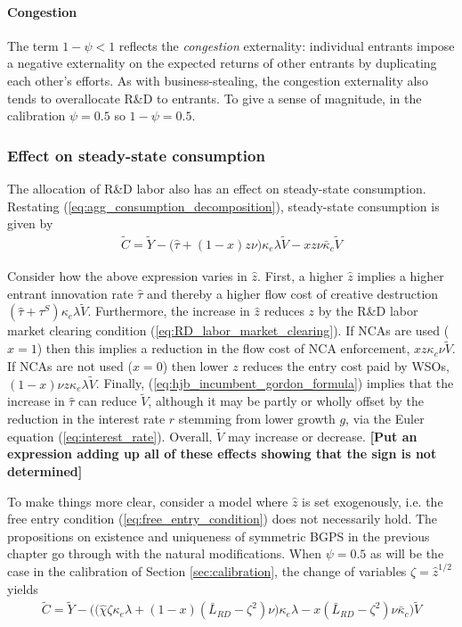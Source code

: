 \documentclass[11pt,english]{article}
\begin{document}
\paragraph{Congestion}

The term $1-\psi < 1$ reflects the \textit{congestion} externality: individual entrants impose a negative externality on the expected returns of other entrants by duplicating each other's efforts. As with business-stealing, the congestion externality also tends to overallocate R\&D to entrants. To give a sense of magnitude, in the calibration $\psi = 0.5$ so $1-\psi = 0.5$.

\subsubsection{Effect on steady-state consumption}

The allocation of R\&D labor also has an effect on steady-state consumption. Restating (\ref{eq:agg_consumption_decomposition}), steady-state consumption is given by
\begin{align} 
\tilde{C} = \tilde{Y} - \big(\hat{\tau} + (1-x) z \nu\big) \kappa_e \lambda \tilde{V}  - x z \nu \bar{\kappa}_c \tilde{V}    
\end{align} 

Consider how the above expression varies in $\hat{z}$. First, a higher $\hat{z}$ implies a higher entrant innovation rate $\hat{\tau}$ and thereby a higher flow cost of creative destruction $(\hat{\tau} + \tau^S)\kappa_e \lambda \tilde{V}$. Furthermore, the increase in $\hat{z}$ reduces $z$ by the R\&D labor market clearing condition (\ref{eq:RD_labor_market_clearing}). If NCAs are used ($x = 1$) then this implies a reduction in the flow cost of NCA enforcement, $x z \kappa_c \nu \tilde{V}$. If NCAs are not used ($x = 0$) then lower $z$ reduces the entry cost paid by WSOs, $(1-x) \nu  z \kappa_e \lambda \tilde{V}$. Finally, (\ref{eq:hjb_incumbent_gordon_formula}) implies that the increase in $\hat{\tau}$ can reduce $\tilde{V}$, although it may be partly or wholly offset by the reduction in the interest rate $r$ stemming from lower growth $g$, via the Euler equation (\ref{eq:interest_rate}). Overall, $\tilde{V}$ may increase or decrease. \textbf{[Put an expression adding up all of these effects showing that the sign is not determined]} 

To make things more clear, consider a model where $\hat{z}$ is set exogenously, i.e. the free entry condition (\ref{eq:free_entry_condition}) does not necessarily hold. The propositions on existence and uniqueness of symmetric BGPS in the previous chapter go through with the natural modifications. When $\psi = 0.5$ as will be the case in the calibration of Section \ref{sec:calibration}, the change of variables $\zeta = \hat{z}^{1/2}$ yields
\begin{align}
	\tilde{C} = \tilde{Y} - \Big(\big(\hat{\chi} \zeta \kappa_e \lambda + (1-x) (\bar{L}_{RD} - \zeta^2) \nu\big) \kappa_e \lambda   - x (\bar{L}_{RD} - \zeta^2) \nu \bar{\kappa}_c \Big)\tilde{V} 
\end{align}
\end{document}
